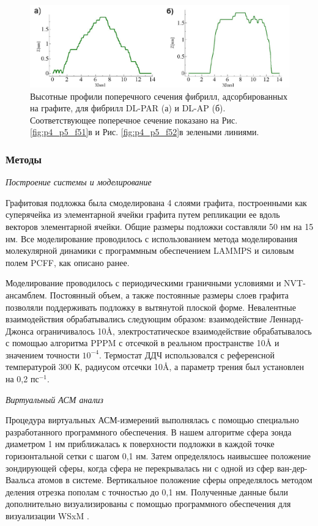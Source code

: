 \begin{figure} [H]
    \centering
    \includegraphics[width=\textwidth]{images/p4/punkt5/part4_p5_f53.pdf}
    \caption[Высотные профили поперечного сечения фибрилл, адсорбированных на графите]{Высотные профили поперечного сечения фибрилл, адсорбированных на графите, для фибрилл DL-PAR (а) и DL-AP (б). Соответствующее поперечное сечение показано на Рис. \ref{fig:p4_p5_f51}в и Рис. \ref{fig:p4_p5_f52}в зелеными линиями.}
    \label{fig:p4_p5_f53}
\end{figure}

\subsubsection{Методы}

    \emph{Построение системы и моделирование}

    Графитовая подложка была смоделирована 4 слоями графита, построенными как суперячейка из элементарной ячейки графита путем репликации ее вдоль векторов элементарной ячейки. Общие размеры подложки составляли 50 нм на 15 нм. Все моделирование проводилось с использованием метода моделирования молекулярной динамики с программным обеспечением LAMMPS и силовым полем PCFF, как описано ранее.
    
    Моделирование проводилось с периодическими граничными условиями и NVT-ансамблем. Постоянный объем, а также постоянные размеры слоев графита позволяли поддерживать подложку в вытянутой плоской форме. Невалентные взаимодействия обрабатывались следующим образом: взаимодействие Леннард-Джонса ограничивалось 10\AA, электростатическое взаимодействие обрабатывалось с помощью алгоритма PPPM \cite{hockney_computer_1989} с отсечкой в реальном пространстве 10\AA{} и значением точности $10^{-4}$. Термостат ДДЧ использовался с референсной температурой 300 К, радиусом отсечки 10\AA, а параметр трения был установлен на 0,2 $пс^{-1}$.

    \emph{Виртуальный АСМ анализ}

    Процедура виртуальных АСМ-измерений выполнялась с помощью специально разработанного программного обеспечения. В нашем алгоритме сфера зонда диаметром 1 нм приближалась к поверхности подложки в каждой точке горизонтальной сетки с шагом 0,1 нм. Затем определялось наивысшее положение зондирующей сферы, когда сфера не перекрывалась ни с одной из сфер ван-дер-Ваальса атомов в системе. Вертикальное положение сферы определялось методом деления отрезка пополам с точностью до 0,1 нм. Полученные данные были дополнительно визуализированы с помощью программного обеспечения для визуализации WSxM \cite{horcas_wsxm_2007}.

